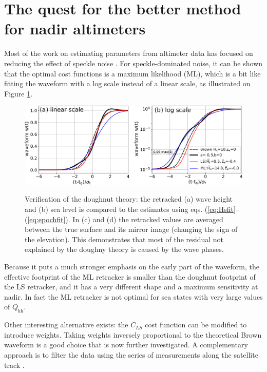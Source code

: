 \section{The quest for the better method for nadir altimeters}
Most of the work on estimating parameters from altimeter data has focused on reducing the effect of speckle noise \citep{Challenor&Srokosz1989}. For speckle-dominated noise, it can be shown that the optimal cost functions is a  maximum likelihood (ML), which is a bit like fitting the waveform with a log scale instead of a linear scale, as illustrated on Figure \ref{fig:alti_linlog}.
\begin{figure}[h!]
\centerline{\includegraphics[width=\textwidth]{FIGS_CH_SAT/waveforms_lin_log.pdf}}
  \caption{Verification of the doughnut theory: the retracked (a) wave height and (b) sea level is compared to the estimates using eqs. (\ref{eq:Hsfit}--(\ref{eq:epochfit}). In (c) and (d) the retracked values are averaged between the true surface and its mirror image (changing the sign of the elevation). This demonstrates that most of the residual not explained by the doughny theory is caused by the wave phases.}{} \label{fig:alti_linlog}
\end{figure}
Because it puts a much stronger emphasis on the early part of the waveform, the effective footprint of the ML retracker is smaller than the doughnut footprint of the LS retracker, and it has a very different shape and a maximum sensitivity at nadir.  In fact the ML retracker is not optimal for sea states with very large values of $Q_{\mathrm{kk}}$.

Other interesting alternative exists: the $C_{LS}$ cost function can be modified to introduce weights. Taking weights inversely proportional to the theoretical Brown waveform is a good choice that is now further investigated. A complementary approach is to  filter the data using the series of measurements along the satellite track \citep{Quilfen&Chapron2019}.




